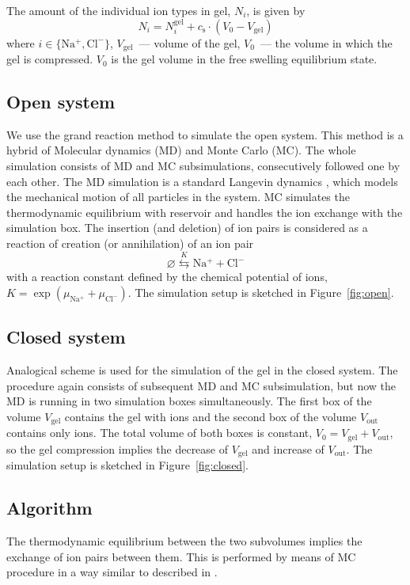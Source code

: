 \documentclass[journal,article,submit,pdftex,moreauthors]{Definitions/mdpi}
\newcommand{\muna}{\mu_\mathrm{Na^+}}
\newcommand{\mucl}{\mu_\mathrm{Cl^-}}
\newcommand{\gel}{^\mathrm{gel}}
\newcommand{\cl}{\mathrm{Cl^-}}
\newcommand{\na}{\mathrm{Na^+}}
\newcommand{\cs}{c_{\mathrm{s}}}
\newcommand{\Vgel}{V_\mathrm{gel}}
\newcommand{\Vout}{V_\mathrm{out}}
\newcommand{\Vbox}{V_0}
\newcommand{\reffig}[1]{Figure~\ref{#1}}
\begin{document}
The amount of the individual ion types in gel, $N_i$, is given by
\begin{equation}
N_i = N_i\gel + \cs\cdot(\Vbox - \Vgel)
\end{equation}
where $i \in \{\na, \cl\}$, $\Vgel$~--- volume of the gel, $\Vbox$~--- the volume in which the gel is compressed. 
$\Vbox$ is the gel volume in the free swelling equilibrium state.


\subsection{Open system}
We use the grand reaction method \cite{Landsgesel2020a,Rud2020} to simulate the open system.
This method is a hybrid of Molecular dynamics (MD) and Monte Carlo (MC). 
The whole simulation consists of MD and MC subsimulations, consecutively followed one by each other. 
The MD simulation is a standard Langevin dynamics \cite{Grest1986}, which models the mechanical motion of all particles in the system. 
MC simulates the thermodynamic equilibrium with reservoir and handles the ion exchange with the simulation box. 
The insertion (and deletion) of ion pairs is considered as a reaction of creation (or annihilation) of an ion pair 
\begin{equation}
\varnothing\stackrel{K}{\leftrightarrows}\na+\cl
\end{equation}
with a reaction constant defined by the chemical potential of ions,
$K=\exp\left(\muna+\mucl\right).$
The simulation setup is sketched in \reffig{fig:open}.

\subsection{Closed system}
Analogical scheme is used for the simulation of the gel in the closed system. 
The procedure  again consists of subsequent MD and MC subsimulation, but now the MD is running in two simulation boxes simultaneously.
The first box of the volume $\Vgel$ contains the gel with ions and the second box of the volume $\Vout$ contains only ions. 
The total volume of both boxes is constant, $\Vbox=V_{\mathrm{gel}}+V_{\mathrm{out}}$, so the gel compression implies the decrease of $\Vgel$ and increase of $\Vout$.
The simulation setup is sketched in \reffig{fig:closed}. 

\subsection{Algorithm}
The thermodynamic equilibrium between the two subvolumes implies the exchange of ion pairs 
between them.
This is performed by means of MC procedure in a way similar to described in \cite{Panagiotopoulos1988b}.
\end{document}

